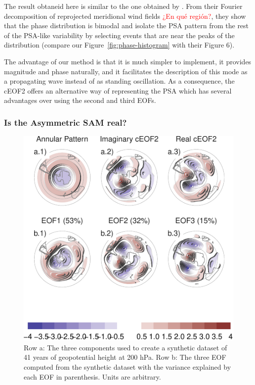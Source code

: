 \documentclass[smallextended]{svjour3}       %
\begin{document}
The result obtaneid here is similar to the one obtained by \citet{irving2016}.
From their Fourier decomposition of reprojected meridional wind fields \textcolor{red}{¿En qué región?}, they show that the phase distribution is bimodal and isolate the PSA pattern from the rest of the PSA-like variability by selecting events that are near the peaks of the distribution (compare our Figure~\ref{fig:phase-histogram} with their Figure 6).

The advantage of our method is that it is much simpler to implement, it provides magnitude and phase naturally, and it facilitates the description of this mode as a propagating wave instead of as standing oscillation.
As a consequence, the cEOF2 offers an alternative way of representing the PSA which has several advantages over using the second and third EOFs.

\hypertarget{is-the-asymmetric-sam-real}{%
\subsubsection{Is the Asymmetric SAM real?}\label{is-the-asymmetric-sam-real}}



\begin{figure}
\centering
\includegraphics{../figures/fake-eof-1.pdf}
\caption{\label{fig:fake-eof}Row a: The three components used to create a synthetic dataset of 41 years of geopotential height at 200 hPa. Row b: The three EOF computed from the synthetic dataset with the variance explained by each EOF in parenthesis. Units are arbitrary.}
\end{figure}
\end{document}
